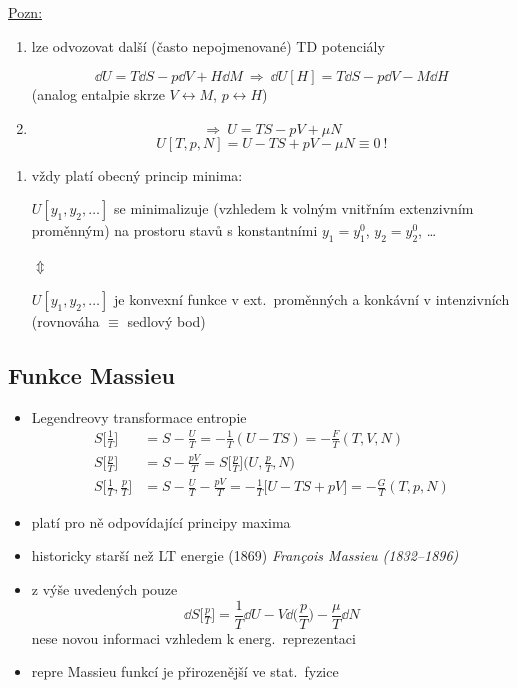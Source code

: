 \underline{Pozn:}
\begin{enumerate}[label=\arabic*)]
  \item lze odvozovat další (často nepojmenované) TD potenciály
  \begin{priklad}
  \[
    \dd U = T\dd S - p\dd V + H\dd M \ \Rightarrow\ \dd U[H] = T\dd S - p\dd V - M\dd H
  \]
  (analog entalpie skrze $V\leftrightarrow M$, $p\leftrightarrow H$)
  \end{priklad}
  \item {}
  \begin{priklad}[Př: Euler]
  \[
    \Rightarrow\ U = TS - pV + \mu N
  \]
  \[
    U[T,p,N] = U - TS + pV - \mu N\equiv 0\ !
  \]
  \end{priklad}
\end{enumerate}

\begin{enumerate}[label=\arabic*),start=3]
  \item vždy platí obecný princip minima:
  \begin{veta}
  $U[y_1,y_2,\dots]$ se minimalizuje (vzhledem k volným vnitřním extenzivním proměnným) na prostoru stavů s konstantními $y_1 = y_1^0$, $y_2 = y_2^0$, \dots
  \begin{center}$\Updownarrow$\end{center}
  $U[y_1,y_2,\dots]$ je konvexní funkce v ext.\ proměnných a konkávní v intenzivních \\
  (rovnováha $\equiv$ sedlový bod)
  \end{veta}
\end{enumerate}

\subsection{Funkce Massieu}
\begin{itemize}
  \item Legendreovy transformace entropie
  \begin{align*}
    S\big[\tfrac1T\big] &= S - \frac{U}{T} = -\frac1T(U - TS) = -\frac{F}{T}(T,V,N) \\
    S\big[\tfrac{p}{T}\big] &= S - \frac{pV}{T} = S\big[\tfrac{p}{T}\big]\big(U,\tfrac{p}{T},N\big) \\
    S\big[\tfrac1T,\tfrac{p}{T}\big] &= S - \frac{U}{T} - \frac{pV}{T} = -\frac1T\big[U - TS + pV\big] = -\frac{G}{T}(T,p,N)
  \end{align*}
  \item platí pro ně odpovídající principy maxima
  \item historicky starší než LT energie (1869) \hfill \textit{\small François Massieu (1832--1896)}
  \item z výše uvedených pouze
  \[
    \dd S\big[\tfrac{p}{T}\big] = \frac1T\dd U - V\dd\Big(\frac{p}{T}\Big) - \frac{\mu}{T}\dd N
  \]
  nese novou informaci vzhledem k energ.\ reprezentaci
  \item repre Massieu funkcí je přirozenější ve stat.\ fyzice
\end{itemize}

